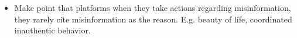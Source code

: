 \documentclass{article}
\begin{document}
{\begin{itemize}
\begin{itemize}
		\item Make point that platforms when they take actions regarding misinformation, they rarely cite misinformation as the reason. E.g. beauty of life, coordinated inauthentic behavior. %
		
		
		

	\end{itemize}
	
\end{itemize}
}



\end{document}
